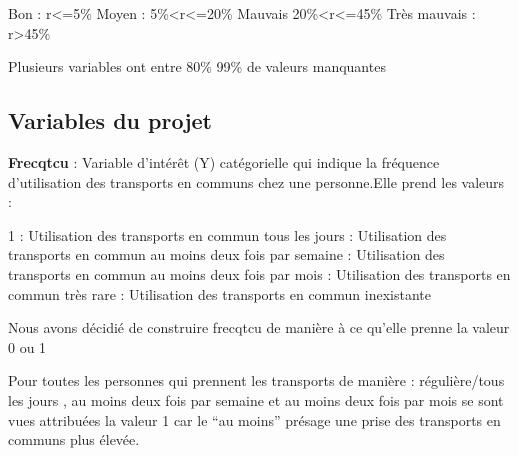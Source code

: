 \documentclass[
]{article}
\newenvironment{Shaded}{\begin{snugshade}}{\end{snugshade}}
\newcommand{\AttributeTok}[1]{\textcolor[rgb]{0.13,0.29,0.53}{#1}}
\newcommand{\DecValTok}[1]{\textcolor[rgb]{0.00,0.00,0.81}{#1}}
\newcommand{\FunctionTok}[1]{\textcolor[rgb]{0.13,0.29,0.53}{\textbf{#1}}}
\newcommand{\NormalTok}[1]{#1}
\newcommand{\OtherTok}[1]{\textcolor[rgb]{0.56,0.35,0.01}{#1}}
\newcommand{\SpecialCharTok}[1]{\textcolor[rgb]{0.81,0.36,0.00}{\textbf{#1}}}
\begin{document}
Bon : r\textless=5\% Moyen : 5\%\textless r\textless=20\% Mauvais
20\%\textless r\textless=45\% Très mauvais : r\textgreater45\%

Plusieurs variables ont entre 80\% 99\% de valeurs manquantes

\hypertarget{variables-du-projet}{%
\subsection{Variables du projet}\label{variables-du-projet}}

\textbf{Frecqtcu} : Variable d'intérêt (Y) catégorielle qui indique la
fréquence d'utilisation des transports en communs chez une
personne.\newline Elle prend les valeurs :

1 : Utilisation des transports en commun tous les jours  : Utilisation des transports en commun au moins deux fois par semaine
 : Utilisation des transports en commun au moins deux fois par mois
: Utilisation des transports en commun très rare  : Utilisation des transports en commun inexistante \newline

Nous avons décidié de construire frecqtcu de manière à ce qu'elle prenne
la valeur 0 ou 1

\begin{Shaded}
\end{Shaded}

Pour toutes les personnes qui prennent les transports de manière :
régulière/tous les jours , au moins deux fois par semaine et au moins
deux fois par mois se sont vues attribuées la valeur 1 car le ``au
moins'' présage une prise des transports en communs plus élevée.
\newline
\end{document}
